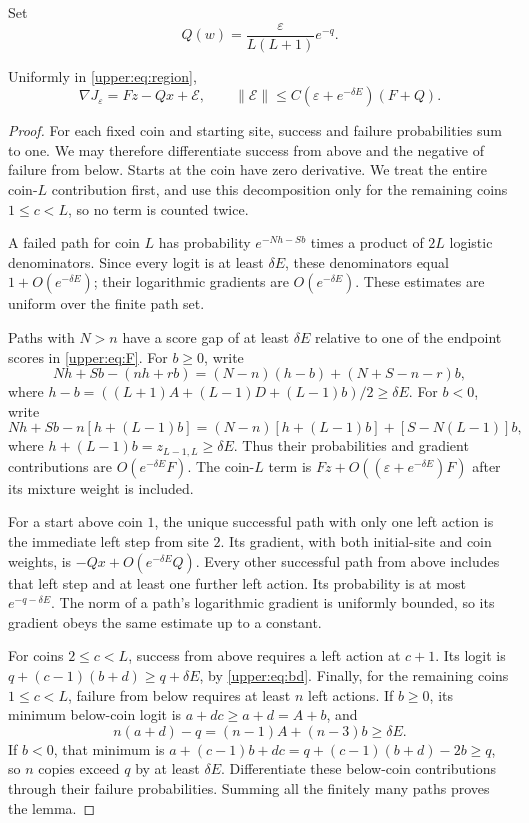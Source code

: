 \documentclass[11pt]{article}
\newcommand{\eps}{\varepsilon}\newcommand{\R}{\mathbb R}
\begin{document}
Set
\begin{equation}\label{upper:eq:Q}
 Q(w)=\frac{\eps}{L(L+1)}e^{-q}.
\end{equation}

\begin{lemma}\label{upper:lem:uniform}
Uniformly in \eqref{upper:eq:region},
\begin{equation}\label{upper:eq:approx}
 \nabla J_\eps=Fz-Qx+\mathcal E,\qquad
 \|\mathcal E\|\le C(\eps+e^{-\delta E})(F+Q).
\end{equation}
\end{lemma}
\begin{proof}
For each fixed coin and starting site, success and failure probabilities
sum to one. We may therefore differentiate success from above and the
negative of failure from below. Starts at the coin have zero derivative.
We treat the entire coin-$L$ contribution first, and use this decomposition
only for the remaining coins $1\le c<L$, so no term is counted twice.

A failed path for coin $L$ has probability
$e^{-Nh-Sb}$ times a product of $2L$ logistic denominators. Since every
logit is at least $\delta E$, these denominators equal $1+O(e^{-\delta E})$;
their logarithmic gradients are $O(e^{-\delta E})$. These estimates are
uniform over the finite path set.

Paths with $N>n$ have a score gap of at least $\delta E$ relative to one
of the endpoint scores in \eqref{upper:eq:F}. For $b\ge0$, write
\[
 Nh+Sb-(nh+rb)=(N-n)(h-b)+(N+S-n-r)b,
\]
where
$h-b=((L+1)A+(L-1)D+(L-1)b)/2\ge\delta E$.
For $b<0$, write
\[
 Nh+Sb-n[h+(L-1)b]
 =(N-n)[h+(L-1)b]+[S-N(L-1)]b,
\]
where $h+(L-1)b=z_{L-1,L}\ge\delta E$.
Thus their probabilities and gradient contributions are $O(e^{-\delta E}F)$.
The coin-$L$ term is $Fz+O((\eps+e^{-\delta E})F)$ after its mixture
weight is included.

For a start above coin $1$, the unique successful path with only one left
action is the immediate left step from site $2$. Its gradient, with both
initial-site and coin weights, is $-Qx+O(e^{-\delta E}Q)$. Every other
successful path from above includes that left step and at least one further
left action. Its probability is at most $e^{-q-\delta E}$. The norm of
a path's logarithmic gradient is uniformly bounded, so its gradient obeys
the same estimate up to a constant.

For coins $2\le c<L$, success from above requires a left action at $c+1$.
Its logit is $q+(c-1)(b+d)\ge q+\delta E$, by \eqref{upper:eq:bd}.
Finally, for the remaining coins $1\le c<L$, failure from below requires at least $n$ left actions.
If $b\ge0$, its minimum below-coin logit is $a+dc\ge a+d=A+b$, and
\[
 n(a+d)-q=(n-1)A+(n-3)b\ge\delta E.
\]
If $b<0$, that minimum is
$a+(c-1)b+dc=q+(c-1)(b+d)-2b\ge q$, so $n$ copies exceed $q$ by at
least $\delta E$. Differentiate these below-coin contributions through their
failure probabilities. Summing all the finitely many paths proves the lemma.
\end{proof}
\end{document}
